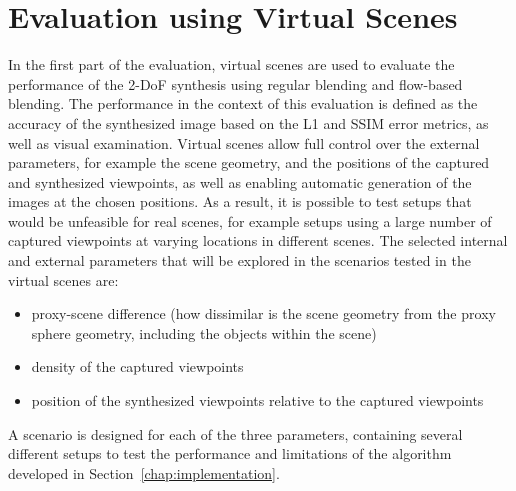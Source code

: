 \section{Evaluation using Virtual Scenes} \label{sec:limit_eval}
In the first part of the evaluation, virtual scenes are used to evaluate the performance of the 2-DoF synthesis using regular blending and flow-based blending. The performance in the context of this evaluation is defined as the accuracy of the synthesized image based on the L1 and SSIM error metrics, as well as visual examination.
Virtual scenes allow full control over the external parameters, for example the scene geometry, and the positions of the captured and synthesized viewpoints, as well as enabling automatic generation of the images at the chosen positions.
As a result, it is possible to test setups that would be unfeasible for real scenes, for example setups using a large number of captured viewpoints at varying locations in different scenes.
The selected internal and external parameters that will be explored in the scenarios tested in the virtual scenes are:
\begin{itemize}
  \item proxy-scene difference (how dissimilar is the scene geometry from the proxy sphere geometry, including the objects within the scene)
  \item density of the captured viewpoints
  \item position of the synthesized viewpoints relative to the captured viewpoints
\end{itemize}

A scenario is designed for each of the three parameters, containing several different setups to test the performance and limitations of the algorithm developed in Section~\ref{chap:implementation}. 



